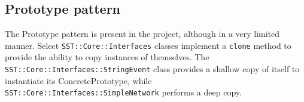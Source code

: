 \subsection{Prototype pattern}
The Prototype pattern is present in the project, although in a very limited manner. Select \texttt{SST::Core::Interfaces} classes implement a \texttt{clone} method to provide the ability to copy instances of themselves. The \\ \texttt{SST::Core::Interfaces::StringEvent} class provides a shallow copy of itself to instantiate its ConcretePrototype, while \texttt{SST::Core::Interfaces::SimpleNetwork} performs a deep copy.
